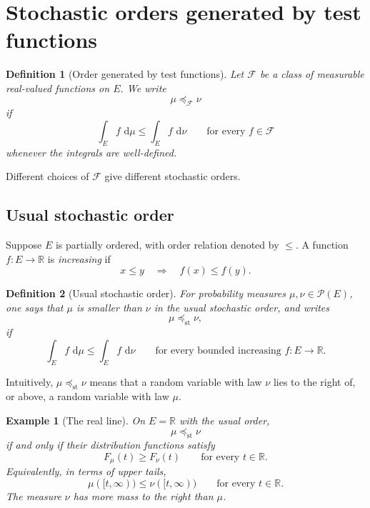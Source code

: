 \documentclass[11pt]{article}
\newtheorem{definition}{Definition}
\newtheorem{example}{Example}
\newcommand{\R}{\mathbb R}
\newcommand{\Pcal}{\mathcal P}
\newcommand{\dd}{\,\mathrm d}
\begin{document}
\section{Stochastic orders generated by test functions}

\begin{definition}[Order generated by test functions]
Let \(\mathcal F\) be a class of measurable real-valued functions on \(E\). We
write
\[
        \mu \preceq_{\mathcal F} \nu
\]
if
\[
        \int_E f\,\dd\mu
        \leq
        \int_E f\,\dd\nu
        \qquad
        \text{for every } f\in\mathcal F
\]
whenever the integrals are well-defined.
\end{definition}

Different choices of \(\mathcal F\) give different stochastic orders.

\subsection{Usual stochastic order}

Suppose \(E\) is partially ordered, with order relation denoted by \(\leq\). A
function \(f:E\to\R\) is \emph{increasing} if
\[
        x\leq y
        \quad\Longrightarrow\quad
        f(x)\leq f(y).
\]

\begin{definition}[Usual stochastic order]
For probability measures \(\mu,\nu\in\Pcal(E)\), one says that \(\mu\) is smaller
than \(\nu\) in the usual stochastic order, and writes
\[
        \mu\preceq_{\mathrm{st}}\nu,
\]
if
\[
        \int_E f\,\dd\mu
        \leq
        \int_E f\,\dd\nu
        \qquad
        \text{for every bounded increasing } f:E\to\R.
\]
\end{definition}

Intuitively, \(\mu\preceq_{\mathrm{st}}\nu\) means that a random variable with
law \(\nu\) lies to the right of, or above, a random variable with law \(\mu\).

\begin{example}[The real line]
On \(E=\R\) with the usual order,
\[
        \mu\preceq_{\mathrm{st}}\nu
\]
if and only if their distribution functions satisfy
\[
        F_\mu(t)\geq F_\nu(t)
        \qquad
        \text{for every } t\in\R.
\]
Equivalently, in terms of upper tails,
\[
        \mu([t,\infty))\leq \nu([t,\infty))
        \qquad
        \text{for every } t\in\R.
\]
The measure \(\nu\) has more mass to the right than \(\mu\).
\end{example}
\end{document}
